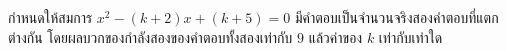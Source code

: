 \question กำหนดให้สมการ $x^2-(k+2)x+(k+5)=0$ มีคำตอบเป็นจำนวนจริงสองคำตอบที่แตกต่างกัน โดยผลบวกของกำลังสองของคำตอบทั้งสองเท่ากับ $9$ แล้วค่าของ $k$ เท่ากับเท่าใด
\newline
{}
